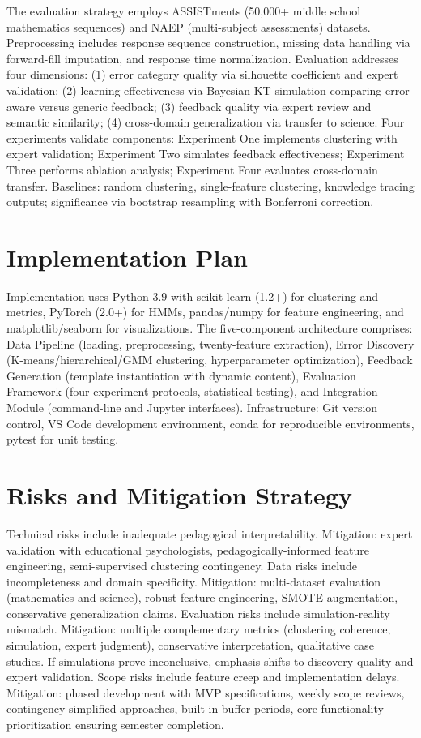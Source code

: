 \documentclass[conference]{IEEEtran}
\begin{document}
The evaluation strategy employs ASSISTments (50,000+ middle school mathematics sequences) and NAEP (multi-subject assessments) datasets. Preprocessing includes response sequence construction, missing data handling via forward-fill imputation, and response time normalization. Evaluation addresses four dimensions: (1) error category quality via silhouette coefficient and expert validation; (2) learning effectiveness via Bayesian KT simulation comparing error-aware versus generic feedback; (3) feedback quality via expert review and semantic similarity; (4) cross-domain generalization via transfer to science. Four experiments validate components: Experiment One implements clustering with expert validation; Experiment Two simulates feedback effectiveness; Experiment Three performs ablation analysis; Experiment Four evaluates cross-domain transfer. Baselines: random clustering, single-feature clustering, knowledge tracing outputs; significance via bootstrap resampling with Bonferroni correction.

\section{Implementation Plan}

Implementation uses Python 3.9 with scikit-learn (1.2+) for clustering and metrics, PyTorch (2.0+) for HMMs, pandas/numpy for feature engineering, and matplotlib/seaborn for visualizations. The five-component architecture comprises: Data Pipeline (loading, preprocessing, twenty-feature extraction), Error Discovery (K-means/hierarchical/GMM clustering, hyperparameter optimization), Feedback Generation (template instantiation with dynamic content), Evaluation Framework (four experiment protocols, statistical testing), and Integration Module (command-line and Jupyter interfaces). Infrastructure: Git version control, VS Code development environment, conda for reproducible environments, pytest for unit testing.

\section{Risks and Mitigation Strategy}

Technical risks include inadequate pedagogical interpretability. Mitigation: expert validation with educational psychologists, pedagogically-informed feature engineering, semi-supervised clustering contingency. Data risks include incompleteness and domain specificity. Mitigation: multi-dataset evaluation (mathematics and science), robust feature engineering, SMOTE augmentation, conservative generalization claims. Evaluation risks include simulation-reality mismatch. Mitigation: multiple complementary metrics (clustering coherence, simulation, expert judgment), conservative interpretation, qualitative case studies. If simulations prove inconclusive, emphasis shifts to discovery quality and expert validation. Scope risks include feature creep and implementation delays. Mitigation: phased development with MVP specifications, weekly scope reviews, contingency simplified approaches, built-in buffer periods, core functionality prioritization ensuring semester completion.
\end{document}
